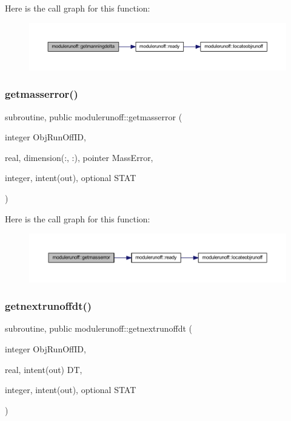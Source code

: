 Here is the call graph for this function\+:\nopagebreak
\begin{figure}[H]
\begin{center}
\leavevmode
\includegraphics[width=350pt]{namespacemodulerunoff_a9ca63f5612ab734b77497c2eca2c05bd_cgraph}
\end{center}
\end{figure}
\mbox{\label{namespacemodulerunoff_a9dff5ff4c2ef0ce7078dd08d46ddeb4b}} 
\subsubsection{\texorpdfstring{getmasserror()}{getmasserror()}}
{\footnotesize\ttfamily subroutine, public modulerunoff\+::getmasserror (\begin{DoxyParamCaption}\item[{integer}]{Obj\+Run\+Off\+ID,  }\item[{real, dimension(\+:, \+:), pointer}]{Mass\+Error,  }\item[{integer, intent(out), optional}]{S\+T\+AT }\end{DoxyParamCaption})}

Here is the call graph for this function\+:\nopagebreak
\begin{figure}[H]
\begin{center}
\leavevmode
\includegraphics[width=350pt]{namespacemodulerunoff_a9dff5ff4c2ef0ce7078dd08d46ddeb4b_cgraph}
\end{center}
\end{figure}
\mbox{\label{namespacemodulerunoff_a364cfd3bda8ba61cda13d20f848f20dc}} 
\subsubsection{\texorpdfstring{getnextrunoffdt()}{getnextrunoffdt()}}
{\footnotesize\ttfamily subroutine, public modulerunoff\+::getnextrunoffdt (\begin{DoxyParamCaption}\item[{integer}]{Obj\+Run\+Off\+ID,  }\item[{real, intent(out)}]{DT,  }\item[{integer, intent(out), optional}]{S\+T\+AT }\end{DoxyParamCaption})}

